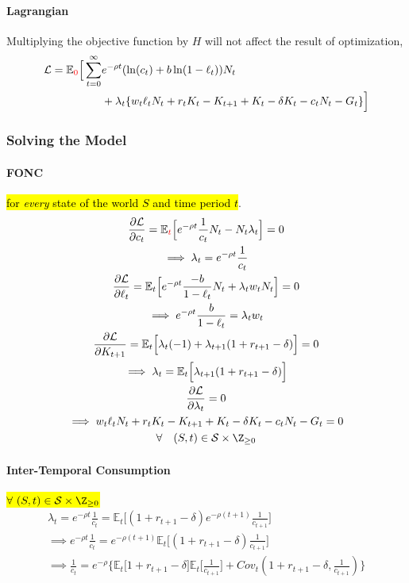 \documentclass[11pt]{article}
\newcommand{\expat}[2]{\mathbb{E}_{#1}\Big[{#2}\Big]}
\begin{document}
				\paragraph{Lagrangian} Multiplying the objective function by $H$ will not affect the result of optimization,
					\begin{align*}
						\mathcal{{L}} = \mathbb{E}_{\textcolor{red}{0}} \Big [
						\sum_{t=0}^\infty & {e^{-\rho t} (\ln(c_t) + b \ln(1-\ell_t)) N_t}\\
						& + \lambda_t \{
						w_t \ell_t N_t + r_t K_t - K_{t+1} + K_t - \delta K_t - c_t N_t - G_t
						\} \Big ]
					\end{align*}
				
			\subsubsection{Solving the Model}
				\paragraph{FONC} \hl{for \emph{every} state of the world $S$ and time period $t$}.
				\begin{gather}
					\pd{\mc{L}}{c_t} = \expat{\textcolor{red}{t}}{e^{-\rho t}\frac{1}{c_t}N_t - N_t \lambda_t} = 0\\
					\implies \lambda_t = e^{-\rho t} \frac{1}{c_t} \\
					\pd{\mc{L}}{\ell_t} = \expat{t}{e^{-\rho t} \frac{-b}{1-\ell_t}N_t + \lambda_t w_t N_t} = 0 \\
					\implies e^{-\rho t}\frac{b}{1-\ell_t} = \lambda_t w_t \\
					\pd{\mc{L}}{K_{t+1}} = \expat{t}{\lambda_t (-1) + \lambda_{t+1}(1+r_{t+1} - \delta)} = 0 \\
					\implies \lambda_t = \expat{t}{\lambda_{t+1}(1 + r_{t+1} - \delta)} \\
					\pd{\mc{L}}{\lambda_t} = 0 \\
					\implies w_t \ell_t N_t + r_t K_t - K_{t+1} + K_t - \delta K_t - c_t N_t - G_t = 0 \\
					\forall \quad (S, t) \in \mc{S} \times \Z_{\geq 0}
				\end{gather}
				
				\paragraph{Inter-Temporal Consumption} \hl{$\forall \ (S, t) \in \mc{S} \times \Z_{\geq 0}$}			
				\begin{gather}
						\lambda_t = e^{-\rho t} \frac{1}{c_t}
						= \expat{t}{(1+r_{t+1}-\delta)e^{-\rho(t+1)} \frac{1}{c_{t+1}}} \\
						\implies e^{-\rho t} \frac{1}{c_t} = e^{-\rho (t+1)} \expat{t}{(1+r_{t+1}-\delta)\frac{1}{c_{t+1}}} \\
						\implies \frac{1}{c_t} = e^{-\rho} \Big \{
							\expat{t}{1+r_{t+1}-\delta}\expat{t}{\frac{1}{c_{t+1}}} + Cov_t(1+r_{t+1}-\delta, \frac{1}{c_{t+1}})
						\Big \}
					\end{gather}
\end{document}
